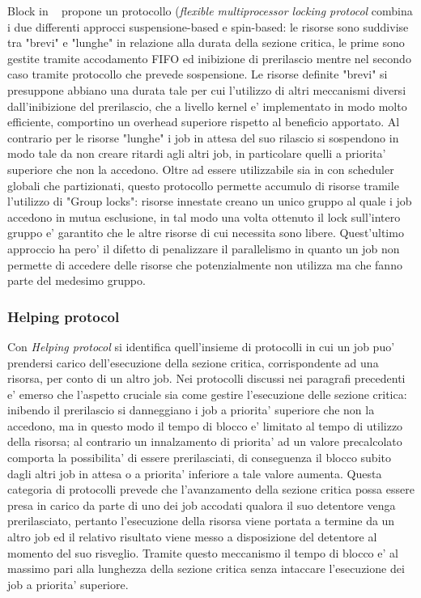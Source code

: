 Block in ~\cite{Block:2007:FRL:1306877.1307316} propone un protocollo (\textit{flexible multiprocessor locking protocol} combina i due differenti approcci suspensione-based e spin-based: le risorse sono suddivise tra "brevi" e "lunghe" in relazione alla durata della sezione critica, le prime sono gestite tramite accodamento FIFO ed inibizione di prerilascio mentre nel secondo caso tramite protocollo che prevede sospensione. Le risorse definite "brevi" si presuppone abbiano una durata tale per cui l'utilizzo di altri meccanismi diversi dall'inibizione del prerilascio, che a livello kernel e' implementato in modo molto efficiente, comportino un overhead superiore rispetto al beneficio apportato. Al contrario per le risorse "lunghe" i job in attesa del suo rilascio si sospendono in modo tale da non creare ritardi agli altri job, in particolare quelli a priorita' superiore che non la accedono. Oltre ad essere utilizzabile sia in con scheduler globali che partizionati, questo protocollo permette accumulo di risorse tramile l'utilizzo di "Group locks": risorse innestate creano un unico gruppo al quale i job accedono in mutua esclusione, in tal modo una volta ottenuto il lock sull'intero gruppo e' garantito che le altre risorse di cui necessita sono libere. Quest'ultimo approccio ha pero' il difetto di penalizzare il parallelismo in quanto un job non permette di accedere delle risorse che potenzialmente non utilizza ma che fanno parte del medesimo gruppo.\\

\subsubsection{Helping protocol}
\label{sec:lockProtocols.help}

Con \textit{Helping protocol} si identifica quell'insieme di protocolli in cui un job puo' prendersi carico dell'esecuzione della sezione critica, corrispondente ad una risorsa, per conto di un altro job. Nei protocolli discussi nei paragrafi precedenti e' emerso che l'aspetto cruciale sia come gestire l'esecuzione delle sezione critica: inibendo il prerilascio si danneggiano i job a priorita' superiore che non la accedono, ma in questo modo il tempo di blocco e' limitato al tempo di utilizzo della risorsa; al contrario un innalzamento di priorita' ad un valore precalcolato comporta la possibilita' di essere prerilasciati, di conseguenza il blocco subito dagli altri job in attesa o a priorita' inferiore a tale valore aumenta. Questa categoria di protocolli prevede che l'avanzamento della sezione critica possa essere presa in carico da parte di uno dei job accodati qualora il suo detentore venga prerilasciato, pertanto l'esecuzione della risorsa viene portata a termine da un altro job ed il relativo risultato viene messo a disposizione del detentore al momento del suo risveglio. Tramite questo meccanismo il tempo di blocco e' al massimo pari alla lunghezza della sezione critica senza intaccare l'esecuzione dei job a priorita' superiore.\\

